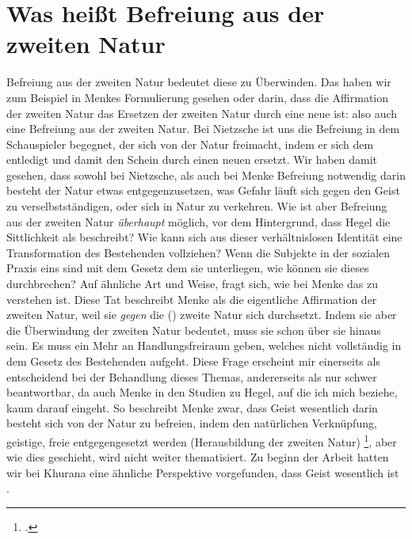 \documentclass[12pt, a4paper, openany]{report}
\begin{document}
\section{Was heißt Befreiung aus der zweiten Natur}\label{abschnitt_3}
Befreiung aus der zweiten Natur bedeutet diese zu Überwinden.
Das haben wir zum Beispiel in Menkes Formulierung  gesehen oder darin, dass die Affirmation der zweiten Natur das Ersetzen der  zweiten Natur durch eine neue ist:
also auch eine Befreiung aus der zweiten Natur.
Bei Nietzsche ist uns die Befreiung in dem Schauspieler begegnet, der sich von der Natur freimacht, indem er sich dem  entledigt und damit den Schein durch einen neuen ersetzt.
Wir haben damit gesehen, dass sowohl bei Nietzsche, als auch bei Menke Befreiung notwendig darin besteht der Natur etwas entgegenzusetzen, was Gefahr läuft sich gegen den Geist zu verselbstständigen, oder sich in Natur zu verkehren.
Wie ist aber Befreiung aus der zweiten Natur \emph{überhaupt} möglich, vor dem Hintergrund, dass Hegel die Sittlichkeit als  beschreibt?
Wie kann sich aus dieser verhältnislosen Identität eine Transformation des Bestehenden vollziehen?
Wenn die Subjekte in der sozialen Praxis eins sind mit dem Gesetz dem sie unterliegen, wie können sie dieses durchbrechen? 
Auf ähnliche Art und Weise, fragt sich, wie bei Menke das  zu verstehen ist.
Diese Tat beschreibt Menke als die eigentliche Affirmation der zweiten Natur, weil sie 
\emph{gegen} die () zweite Natur sich durchsetzt. 
Indem sie aber die Überwindung der zweiten Natur bedeutet, muss sie schon über sie hinaus sein. 
Es muss ein Mehr an Handlungsfreiraum geben, welches nicht vollständig in dem Gesetz des Bestehenden aufgeht.
Diese Frage erscheint mir einerseits als entscheidend bei der Behandlung dieses Themas, andererseits als nur schwer beantwortbar, da auch Menke in den Studien zu Hegel, auf die ich mich beziehe, kaum darauf eingeht.
So beschreibt Menke zwar, dass Geist wesentlich darin besteht sich von der Natur zu befreien, indem den natürlichen Verknüpfung, geistige, freie entgegengesetzt werden (Herausbildung der zweiten Natur) \footcite[Vgl.][39]{menke_autonomie_2018}, aber wie dies geschieht, wird nicht weiter thematisiert. 
Zu beginn der Arbeit hatten wir bei Khurana eine ähnliche Perspektive vorgefunden, dass Geist wesentlich ist . 
\end{document}
